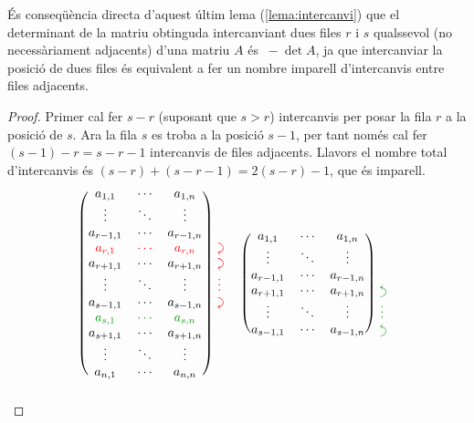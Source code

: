 \begin{lema}
\begin{col} \label{col:intercanvi}
	És conseqüència directa d'aquest últim lema (\ref{lema:intercanvi}) que el determinant de la matriu obtinguda intercanviant dues files $r$ i $s$ qualssevol (no necessàriament adjacents) d'una matriu $A$ és $\ -\det A$, ja que intercanviar la posició de dues files és equivalent a fer un nombre imparell d'intercanvis entre files adjacents.
	
		\begin{proof}
		Primer cal fer $s-r$ (suposant que $s>r$) intercanvis per posar la fila $r$ a la posició de $s$. Ara la fila $s$ es troba a la posició $s-1$, per tant només cal fer $(s-1)-r = s-r-1$ intercanvis de files adjacents. Llavors el nombre total d'intercanvis és $(s-r)+(s-r-1) = 2(s-r) - 1$, que és imparell.
		\[
		\begin{blockarray}{cccc}
		\begin{block}{(ccc)*{1}{>{\color{red}}l<{}}}
		a_{1,1}&	\cdots&		a_{1,n}& 		\\
		\vdots&		\ddots&		\vdots& 		\\
		a_{r-1,1}&	\cdots&		a_{r-1,n}&    	\\
		\rd a_{r,1}&\rd\cdots&	\rd a_{r,n}&    \dcarr \\
		a_{r+1,1}&	\cdots&		a_{r+1,n}&    	\dcarr\\
		\vdots&		\ddots&		\vdots& 		\vdots\\
		a_{s-1,1}&	\cdots&		a_{s-1,n}&    	\dcarr \\
		\gre a_{s,1}&\gre\cdots&	\gre a_{s,n}&    \\
		a_{s+1,1}&	\cdots&		a_{s+1,n}&    	\\
		\vdots&		\ddots&		\vdots& 		\\
		a_{n,1}&	\cdots&		a_{n,n}& 		\\	
		\end{block}
		\end{blockarray}
		\quad
		\begin{blockarray}{cccc}
		\begin{block}{(ccc)*{1}{>{\color{ForestGreen}}l<{}}}
		a_{1,1}&	\cdots&		a_{1,n}& 		\\
		\vdots&		\ddots&		\vdots& 		\\
		a_{r-1,1}&	\cdots&		a_{r-1,n}&    	\\
		a_{r+1,1}&	\cdots&		a_{r+1,n}&    	\ucarr\\
		\vdots&		\ddots&		\vdots& 		\vdots\\
		a_{s-1,1}&	\cdots&		a_{s-1,n}&    	\ucarr\\

\end{block}
\end{blockarray}\]
\end{proof}
\end{col}
\end{lema}
